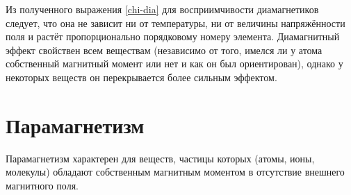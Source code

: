 %
%
%


Из полученного выражения \eqref{chi-dia} для восприимчивости диамагнетиков
следует, что она не зависит ни от температуры, ни от величины напряжённости поля
и растёт пропорционально порядковому номеру элемента.
Диамагнитный эффект свойствен всем веществам (независимо от того, имелся ли у
атома собственный магнитный момент или нет и как он был ориентирован), однако у
некоторых веществ он перекрывается более сильным 
эффектом.


\section{Парамагнетизм}
\label{sec:paramagnetism}

Парамагнетизм характерен для веществ, частицы которых (атомы, ионы, молекулы)
обладают собственным магнитным моментом в отсутствие внешнего магнитного поля.

